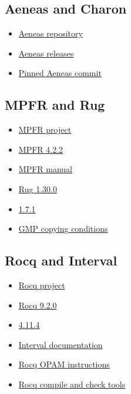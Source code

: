 \documentclass[11pt]{article}
\begin{document}
\subsection*{Aeneas and Charon}
\begin{itemize}
  \item \href{https://github.com/AeneasVerif/aeneas}{Aeneas repository}
  \item \href{https://github.com/AeneasVerif/aeneas/releases}{Aeneas releases}
  \item
  \href{https://github.com/AeneasVerif/aeneas/commit/6e167c9b63a4dafd66d0e0edd9d94669f957ff7b}
  {Pinned Aeneas commit}
\end{itemize}

\subsection*{MPFR and Rug}
\begin{itemize}
  \item \href{https://www.mpfr.org/}{MPFR project}
  \item \href{https://www.mpfr.org/mpfr-current/}{MPFR 4.2.2}
  \item \href{https://www.mpfr.org/mpfr-current/mpfr.html}{MPFR manual}
  \item \href{https://docs.rs/rug/1.30.0/rug/}{Rug 1.30.0}
  \item \href{https://docs.rs/gmp-mpfr-sys/1.7.1/gmp_mpfr_sys/}
  { 1.7.1}
  \item \href{https://gmplib.org/manual/Copying}{GMP copying conditions}
\end{itemize}

\subsection*{Rocq and Interval}
\begin{itemize}
  \item \href{https://rocq-prover.org/}{Rocq project}
  \item \href{https://github.com/rocq-prover/rocq/releases/tag/V9.2.0}{Rocq 9.2.0}
  \item \href{https://rocq-prover.org/p/coq-interval/4.11.4}
  { 4.11.4}
  \item \href{https://coqinterval.gitlabpages.inria.fr/}{Interval documentation}
  \item \href{https://rocq-prover.org/docs/using-opam}{Rocq OPAM instructions}
  \item
  \href{https://docs.rocq-prover.org/master/refman/practical-tools/coq-commands.html}
  {Rocq compile and check tools}
\end{itemize}

\endgroup
\end{document}

